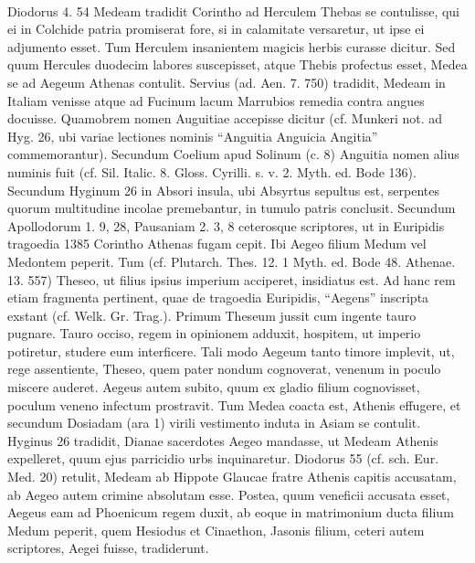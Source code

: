 \documentclass[landscape, a4paper, 11pt, oneside, polutonikogreek, german]{article}
\begin{document}
\paragraph{}
Diodorus 4. 54 Medeam tradidit Corintho ad Herculem Thebas se contulisse, qui ei in Colchide patria promiserat fore, si in calamitate versaretur, ut ipse ei adjumento esset. Tum Herculem insanientem magicis herbis curasse dicitur. Sed quum Hercules duodecim labores suscepisset, atque Thebis profectus esset, Medea se ad Aegeum Athenas contulit. Servius (ad. Aen. 7. 750) tradidit, Medeam in Italiam venisse atque ad Fucinum lacum Marrubios remedia contra angues docuisse. Quamobrem nomen Auguitiae accepisse dicitur (cf. Munkeri not. ad Hyg. 26, ubi variae lectiones nominis "`Anguitia Anguicia Angitia"' commemorantur). Secundum Coelium apud Solinum (c. 8) Anguitia nomen alius numinis fuit (cf. Sil. Italic. 8. Gloss. Cyrilli. s. v. 2. Myth. ed. Bode 136). Secundum Hyginum 26 in Absori insula, ubi Absyrtus sepultus est, serpentes quorum multitudine incolae premebantur, in tumulo patris conclusit. Secundum Apollodorum 1. 9, 28, Pausaniam 2. 3, 8 ceterosque scriptores, ut in Euripidis tragoedia 1385 Corintho Athenas fugam cepit. Ibi Aegeo filium Medum vel Medontem peperit. Tum (cf. Plutarch. Thes. 12. 1 Myth. ed. Bode 48. Athenae. 13. 557) Theseo, ut filius ipsius imperium acciperet, insidiatus est. Ad hanc rem etiam fragmenta pertinent, quae de tragoedia Euripidis, "`Aegens"' inscripta exstant (cf. Welk. Gr. Trag.). Primum Theseum jussit cum ingente tauro pugnare. Tauro occiso, regem in opinionem adduxit, hospitem, ut imperio potiretur, studere eum interficere. Tali modo Aegeum tanto timore implevit, ut, rege assentiente, Theseo, quem pater nondum cognoverat, venenum in poculo miscere auderet. Aegeus autem subito, quum ex gladio filium cognovisset, poculum veneno infectum prostravit. Tum Medea coacta est, Athenis effugere, et secundum Dosiadam (ara 1) virili vestimento induta in Asiam se contulit. Hyginus 26 tradidit, Dianae sacerdotes Aegeo mandasse, ut Medeam Athenis expelleret, quum ejus parricidio urbs inquinaretur. Diodorus 55 (cf. sch. Eur. Med. 20) retulit, Medeam ab Hippote Glaucae fratre Athenis capitis accusatam, ab Aegeo autem crimine absolutam esse. Postea, quum veneficii accusata esset, Aegeus eam ad Phoenicum regem duxit, ab eoque in matrimonium ducta filium Medum peperit, quem Hesiodus et Cinaethon, Jasonis filium, ceteri autem scriptores, Aegei fuisse, tradiderunt.
\end{document}
